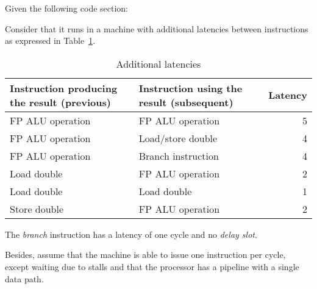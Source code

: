 \begin{acexercise}
\end{acexercise}

Given the following code section:



Consider that it runs in a machine with additional latencies between
instructions as expressed in Table~\ref{tab:ex-may-2012:lat}.

\begin{table}[htbp]
\caption{Additional latencies}
\label{tab:ex-may-2012:lat}

\begin{tabular}{|p{}|p{}|p{}|}

\hline
Instruction producing the result (previous) &
Instruction using the result (subsequent) &
Latency
\\
\hline
\hline

FP ALU operation &
FP ALU operation &
\multicolumn{1}{r|}{5}
\\
\hline

FP ALU operation &
Load/store double &
\multicolumn{1}{r|}{4}
\\
\hline

FP ALU operation &
Branch instruction &
\multicolumn{1}{r|}{4}
\\
\hline

Load double &
FP ALU operation &
\multicolumn{1}{r|}{2}
\\
\hline

Load double &
Load double &
\multicolumn{1}{r|}{1}
\\
\hline

Store double &
FP ALU operation &
\multicolumn{1}{r|}{2}
\\
\hline

\end{tabular}

\end{table}

The \emph{branch} instruction has a latency of one cycle and no 
\emph{delay slot}. 

Besides, assume that the machine is able to issue one instruction per cycle,
except waiting due to stalls and that the processor has a pipeline with a
single data path.

